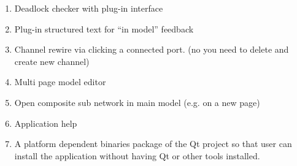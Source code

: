 \begin{itemize}
\begin{enumerate}
\item	Deadlock checker with plug-in interface
\item	Plug-in structured text for “in model” feedback
\item Channel rewire via clicking a connected port. (no you need to delete and
create new channel)
\item	Multi page model editor
\item	Open composite sub network in main model (e.g. on a new page)
\item	Application help
\item A platform dependent binaries package of the Qt project so that user can
install the application without having Qt or other tools installed.
\end{enumerate}
\end{itemize}



